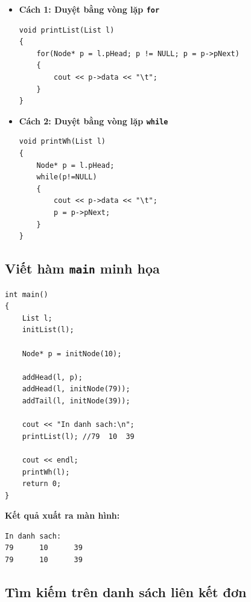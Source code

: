 \documentclass[12pt,a4paper]{article}
\begin{document}
\begin{itemize}[itemsep=0.25em]
    \item \textbf{Cách 1: Duyệt bằng vòng lặp \texttt{for}}
\begin{lstlisting}
void printList(List l)
{
    for(Node* p = l.pHead; p != NULL; p = p->pNext)
    {
        cout << p->data << "\t";
    }
}
\end{lstlisting}

    \item \textbf{Cách 2: Duyệt bằng vòng lặp \texttt{while}}
\begin{lstlisting}
void printWh(List l)
{
    Node* p = l.pHead;
    while(p!=NULL)
    {
        cout << p->data << "\t";
        p = p->pNext;
    }
}
\end{lstlisting}
\end{itemize}

\needspace{8cm}
\subsection{Viết hàm \texttt{main} minh họa}
\begin{lstlisting}
int main()
{
    List l;
    initList(l);

    Node* p = initNode(10);

    addHead(l, p);
    addHead(l, initNode(79));
    addTail(l, initNode(39));

    cout << "In danh sach:\n";
    printList(l); //79  10  39

    cout << endl;
    printWh(l);
    return 0;
}
\end{lstlisting}

\noindent\textbf{Kết quả xuất ra màn hình:}
\begin{lstlisting}[numbers=none]
In danh sach:
79      10      39
79      10      39
\end{lstlisting}

\subsection{Tìm kiếm trên danh sách liên kết đơn}
\end{document}
